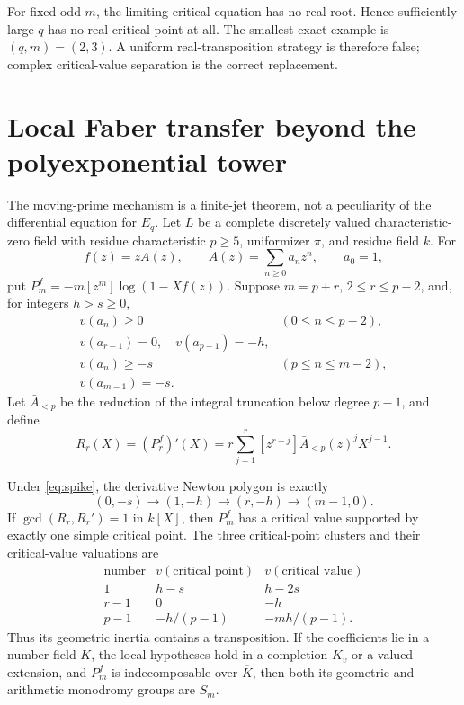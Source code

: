 For fixed odd $m$, the limiting critical equation has no real root. Hence
sufficiently large $q$ has no real critical point at all. The smallest exact
example is $(q,m)=(2,3)$. A uniform real-transposition strategy is therefore
false; complex critical-value separation is the correct replacement.

\section{Local Faber transfer beyond the polyexponential tower}

The moving-prime mechanism is a finite-jet theorem, not a peculiarity of
the differential equation for $E_q$. Let $L$ be a complete discretely
valued characteristic-zero field with residue characteristic $p\ge5$,
uniformizer $\pi$, and residue field $k$. For
\[
f(z)=zA(z),\qquad A(z)=\sum_{n\ge0}a_nz^n,\qquad a_0=1,
\]
put $P_m^f=-m[z^m]\log(1-Xf(z))$. Suppose $m=p+r$,
$2\le r\le p-2$, and, for integers $h>s\ge0$,
\begin{equation}
\begin{array}{ll}
v(a_n)\ge0 &(0\le n\le p-2),\\
v(a_{r-1})=0,\quad v(a_{p-1})=-h,\\
v(a_n)\ge-s &(p\le n\le m-2),\\
v(a_{m-1})=-s.
\end{array}
\label{eq:spike}
\end{equation}
Let $\bar A_{<p}$ be the reduction of the integral truncation below
degree $p-1$, and define
\begin{equation}
R_r(X)=\overline{(P_r^f)'(X)}
=r\sum_{j=1}^r[z^{r-j}]\bar A_{<p}(z)^jX^{j-1}.
\label{eq:R-general}
\end{equation}

\begin{theorem}\label{thm:transfer}
Under \eqref{eq:spike}, the derivative Newton polygon is exactly
\begin{equation}
(0,-s)\longrightarrow(1,-h)\longrightarrow(r,-h)
\longrightarrow(m-1,0).
\label{eq:spike-NP}
\end{equation}
If $\gcd(R_r,R_r')=1$ in $k[X]$, then $P_m^f$ has a critical value
supported by exactly one simple critical point. The three critical-point
clusters and their critical-value valuations are
\begin{equation}
\begin{array}{c|c|c}
\text{number}&v(\text{critical point})&v(\text{critical value})\\ \hline
1&h-s&h-2s\\
r-1&0&-h\\
p-1&-h/(p-1)&-mh/(p-1).
\end{array}
\label{eq:cluster-table}
\end{equation}
Thus its geometric inertia contains a transposition. If the coefficients
lie in a number field $K$, the local hypotheses hold in a completion $K_v$
or a valued extension, and $P_m^f$ is indecomposable over $\overline K$,
then both its geometric and arithmetic monodromy groups are $S_m$.
\end{theorem}

